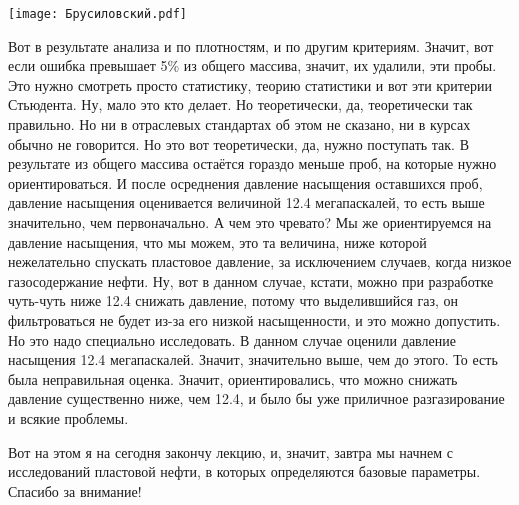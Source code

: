\documentclass[main.tex]{subfiles}
\begin{document}
\begin{center}
\texttt{[image: Брусиловский.pdf]}
\end{center}

Вот в результате анализа и по плотностям, и по другим критериям.
Значит, вот если ошибка превышает 5\% из общего массива, значит, их удалили, эти пробы.
Это нужно смотреть просто статистику, теорию статистики и вот эти критерии Стьюдента.
Ну, мало это кто делает.
Но теоретически, да, теоретически так правильно.
Но ни в отраслевых стандартах об этом не сказано, ни в курсах обычно не говорится.
Но это вот теоретически, да, нужно поступать так.
В результате из общего массива остаётся гораздо меньше проб, на которые нужно ориентироваться.
И после осреднения давление насыщения оставшихся проб, давление насыщения оценивается величиной 12.4 мегапаскалей, то есть выше значительно, чем первоначально.
А чем это чревато?
Мы же ориентируемся на давление насыщения, что мы можем, это та величина, ниже которой нежелательно спускать пластовое давление, за исключением случаев, когда низкое газосодержание нефти.
Ну, вот в данном случае, кстати, можно при разработке чуть-чуть ниже 12.4 снижать давление, потому что выделившийся газ, он фильтроваться не будет из-за его низкой насыщенности, и это можно допустить.
Но это надо специально исследовать.
В данном случае оценили давление насыщения 12.4 мегапаскалей.
Значит, значительно выше, чем до этого.
То есть была неправильная оценка.
Значит, ориентировались, что можно снижать давление существенно ниже, чем 12.4, и было бы уже приличное разгазирование и всякие проблемы.

Вот на этом я на сегодня закончу лекцию, и, значит, завтра мы начнем с исследований пластовой нефти, в которых определяются базовые параметры.
Спасибо за внимание!
\end{document}

